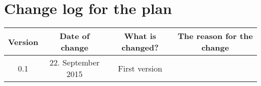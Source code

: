 \section{Change log for the plan}
\begin{tabular}{|c|c|c|c|} 
    \hline
    Version & Date of change & What is changed? & The reason for the change \\
    \hline\hline
    0.1 & 22. September 2015 & First version & \\
   \hline
\end{tabular}
